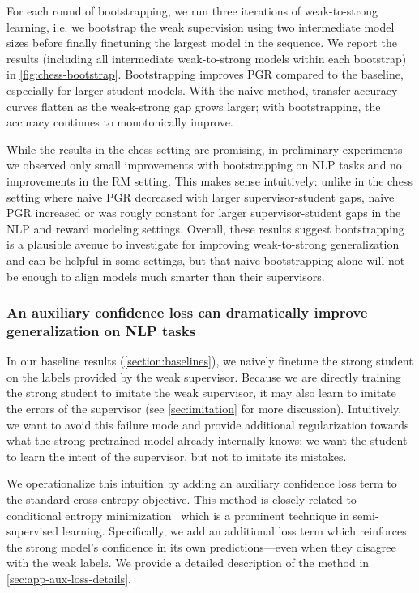For each round of bootstrapping, we run three iterations of weak-to-strong learning, i.e. we bootstrap the weak supervision using two intermediate model sizes before finally finetuning the largest model in the sequence. We report the results (including all intermediate weak-to-strong models within each bootstrap) in \ref{fig:chess-bootstrap}. 
Bootstrapping improves PGR compared to the baseline, especially for larger student models. With the naive method, transfer accuracy curves flatten as the weak-strong gap grows larger; with bootstrapping, the accuracy continues to monotonically improve.

While the results in the chess setting are promising, in preliminary experiments we observed only small improvements with bootstrapping on NLP tasks and no improvements in the RM setting. This makes sense intuitively: unlike in the chess setting where naive PGR decreased with larger supervisor-student gaps, naive PGR increased or was rougly constant for larger supervisor-student gaps in the NLP and reward modeling settings. Overall, these results suggest bootstrapping is a plausible avenue to investigate for improving weak-to-strong generalization and can be helpful in some settings, but that naive bootstrapping alone will not be enough to align models much smarter than their supervisors.

\subsubsection{An auxiliary confidence loss can dramatically improve generalization on NLP tasks}
\label{sec:auxloss}

In our baseline results (\ref{section:baselines}), we naively finetune the strong student on the labels provided by the weak supervisor. Because we are directly training the strong student to imitate the weak supervisor, it may also learn to imitate the errors of the supervisor (see \ref{sec:imitation} for more discussion). Intuitively, we want to avoid this failure mode and provide additional regularization towards what the strong pretrained model already internally knows: we want the student to learn the intent of the supervisor, but not to imitate its mistakes.

We operationalize this intuition by adding an auxiliary confidence loss term to the standard cross entropy objective. This method is closely related to conditional entropy minimization~\citep{grandvalet2004semi} which is a prominent technique in semi-supervised learning. Specifically, we add an additional loss term which reinforces the strong model's confidence in its own predictions---even when they disagree with the weak labels. We provide a detailed description of the method in \ref{sec:app-aux-loss-details}.

